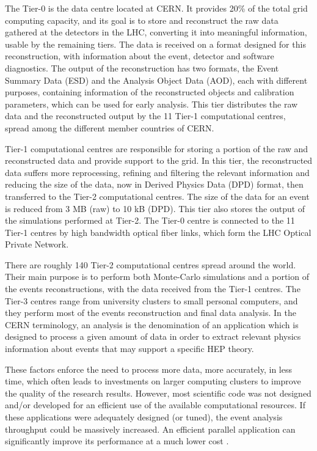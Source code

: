 The Tier-0 is the data centre located at CERN. It provides 20\% of the total grid computing capacity, and its goal is to store and reconstruct the raw data gathered at the detectors in the LHC, converting it into meaningful information, usable by the remaining tiers. The data is received on a format designed for this reconstruction, with information about the event, detector and software diagnostics. The output of the reconstruction has two formats, the Event Summary Data (ESD) and the Analysis Object Data (AOD), each with different purposes, containing information of the reconstructed objects and calibration parameters, which can be used for early analysis. This tier distributes the raw data and the reconstructed output by the 11 Tier-1 computational centres, spread among the different member countries of CERN.

Tier-1 computational centres are responsible for storing a portion of the raw and reconstructed data and provide support to the grid. In this tier, the reconstructed data suffers more reprocessing, refining and filtering the relevant information and reducing the size of the data, now in Derived Physics Data (DPD) format, then transferred to the Tier-2 computational centres. The size of the data for an event is reduced from 3 MB (raw) to 10 kB (DPD). This tier also stores the output of the simulations performed at Tier-2. The Tier-0 centre is connected to the 11 Tier-1 centres by high bandwidth optical fiber links, which form the LHC Optical Private Network.

There are roughly 140 Tier-2 computational centres spread around the world. Their main purpose is to perform both Monte-Carlo simulations and a portion of the events reconstructions, with the data received from the Tier-1 centres. The Tier-3 centres range from university clusters to small personal computers, and they perform most of the events reconstruction and final data analysis. In the CERN terminology, an analysis is the denomination of an application which is designed to process a given amount of data in order to extract relevant physics information about events that may support a specific HEP theory.

These factors enforce the need to process more data, more accurately, in less time, which often leads to investments on larger computing clusters to improve the quality of the research results. However, most scientific code was not designed and/or developed for an efficient use of the available computational resources. If these applications were adequately designed (or tuned), the event analysis throughput could be massively increased. An efficient parallel application can significantly improve its performance at a much lower cost \cite{Msc:AMP}.

